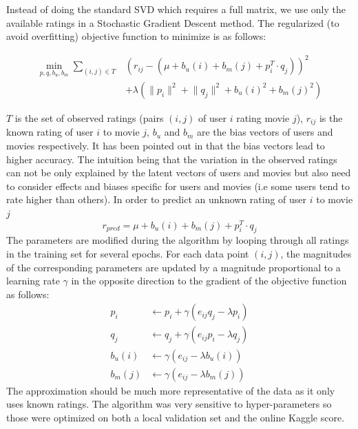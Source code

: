 \documentclass[10pt,conference,compsocconf]{IEEEtran}
\begin{document}
Instead of doing the standard SVD which requires a full matrix, we use only the available ratings in a Stochastic Gradient Descent method. The regularized (to avoid overfitting) objective function to minimize is as follows:

\begin{equation}
\begin{split}
\min_{p,q,b_u,b_m} \sum_{(i,j) \in T} &(r_{ij} - (\mu + b_u(i) + b_m(j) + p_i^T \cdot q_j))^2 \\ &+ \lambda(\lVert p_i \rVert^2 + \lVert q_j \rVert^2 + b_u(i)^2 + b_m(j)^2) 
\end{split}
\end{equation}

$T$ is the set of observed ratings (pairs $(i,j)$ of user $i$ rating movie $j$), $r_{ij}$ is the known rating of user $i$ to movie $j$, $b_u$ and $b_m$ are the bias vectors of users and movies respectively. It has been pointed out in \cite{Koren09matrixfactorization} that the bias vectors lead to higher accuracy. The intuition being that the variation in the observed ratings can not be only explained by the latent vectors of users and movies but also need to consider effects and biases specific for users and movies (i.e some users tend to rate higher than others). In order to predict an unknown rating of user $i$ to movie $j$
\begin{equation}
	r_{pred} = \mu + b_u(i) + b_m(j) + p_i^T\cdot q_j
\end{equation}
The parameters are modified during the algorithm by looping through all ratings in the training set for several epochs. For each data point $(i,j)$, the magnitudes of the corresponding parameters are updated by a magnitude proportional to a learning rate $\gamma$ in the opposite direction to the gradient of the objective function as follows:
\begin{equation}
\begin{split}
	p_i &\leftarrow p_i + \gamma(e_{ij}q_j - \lambda p_i) \\
	q_j &\leftarrow q_j + \gamma(e_{ij}p_i - \lambda q_j) \\
	b_u(i) &\leftarrow \gamma(e_{ij} - \lambda b_u(i)) \\
	b_m(j) &\leftarrow \gamma(e_{ij} - \lambda b_m(j)) 
\end{split}
\end{equation}
The approximation should be much more representative of the data as it only uses known ratings. The algorithm was very sensitive to hyper-parameters so those were optimized on both a local validation set and the online Kaggle score.
\end{document}
